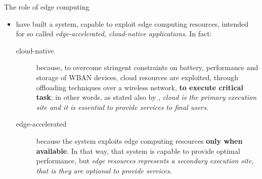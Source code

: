 \documentclass[10pt]{beamer}
\begin{document}
\begin{frame}{The role of edge computing} 

\begin{itemize}

\item \citet{MSAReport} have built a system, capable to exploit edge computing resources, intended for so called \textit{edge-accelerated, cloud-native applications}. \cite{TheSeminalRoleEdgeNativeApplications}\cite{TheEmergenceOfEdgeComputing} In fact:

\begin{description}

\item[cloud-native] because, to overcome stringent constraints on battery, performance and storage of WBAN devices, cloud resources are exploited, through offloading techniques over a wireless network, \textbf{to execute critical task}; in other words, as stated also by \citet{MSAReport}, \textit{cloud is the primary execution site and it is essential to provide services to final users}.

\item[edge-accelerated] because the system exploits edge computing resources \textbf{only when available}. In that way, that system is capable to provide optimal performance, but \textit{edge resources represents a secondary execution site, that is they are optional to provide services}.

\end{description}

\end{itemize}

\end{frame} 
\end{document}
